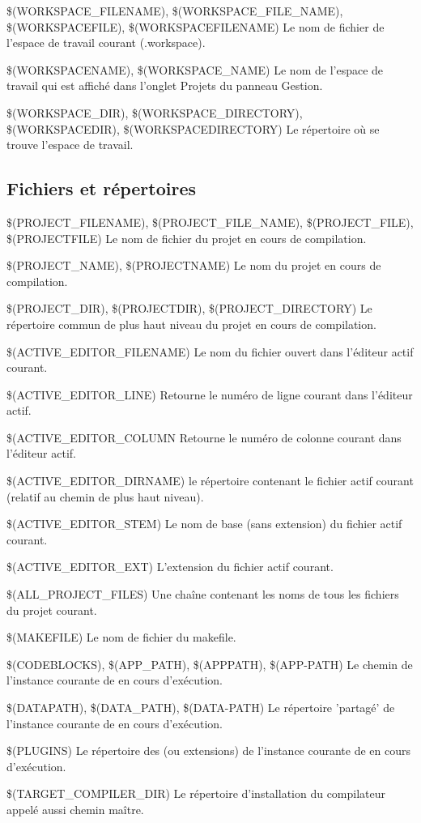 \begin{codeentry}
\item[\$(WORKSPACE\_FILENAME), \$(WORKSPACE\_FILE\_NAME), \$(WORKSPACEFILE), \$(WORKSPACEFILENAME)] Le nom de fichier de l'espace de travail courant (.workspace).
\item[\$(WORKSPACENAME), \$(WORKSPACE\_NAME)] Le nom de l'espace de travail qui est affiché dans l'onglet Projets du panneau Gestion.
\item[\$(WORKSPACE\_DIR), \$(WORKSPACE\_DIRECTORY), \$(WORKSPACEDIR), \$(WORKSPACEDIRECTORY)] Le répertoire où se trouve l'espace de travail.
\end{codeentry}

\subsection{Fichiers et répertoires}

\begin{codeentry}
\item[\$(PROJECT\_FILENAME), \$(PROJECT\_FILE\_NAME), \$(PROJECT\_FILE), \$(PROJECTFILE)] Le nom de fichier du projet en cours de compilation.
\item[\$(PROJECT\_NAME), \$(PROJECTNAME)] Le nom du projet en cours de compilation.
\item[\$(PROJECT\_DIR), \$(PROJECTDIR), \$(PROJECT\_DIRECTORY)] Le répertoire commun de plus haut niveau du projet en cours de compilation.
\item[\$(ACTIVE\_EDITOR\_FILENAME)] Le nom du fichier ouvert dans l'éditeur actif courant.
\item[\$(ACTIVE\_EDITOR\_LINE)] Retourne le numéro de ligne courant dans l'éditeur actif.
\item[\$(ACTIVE\_EDITOR\_COLUMN] Retourne le numéro de colonne courant dans l'éditeur actif.
\item[\$(ACTIVE\_EDITOR\_DIRNAME)] le répertoire contenant le fichier actif courant (relatif au chemin de plus haut niveau).
\item[\$(ACTIVE\_EDITOR\_STEM)] Le nom de base (sans extension) du fichier actif courant.
\item[\$(ACTIVE\_EDITOR\_EXT)] L'extension du fichier actif courant.
\item[\$(ALL\_PROJECT\_FILES)] Une chaîne contenant les noms de tous les fichiers du projet courant.
\item[\$(MAKEFILE)] Le nom de fichier du makefile.
\item[\$(CODEBLOCKS), \$(APP\_PATH), \$(APPPATH), \$(APP-PATH)] Le chemin de l'instance courante de \codeblocks en cours d'exécution.
\item[\$(DATAPATH), \$(DATA\_PATH), \$(DATA-PATH)] Le répertoire 'partagé' de l'instance courante de \codeblocks en cours d'exécution.
\item[\$(PLUGINS)] Le répertoire des  (ou extensions) de l'instance courante de \codeblocks en cours d'exécution.
\item[\$(TARGET\_COMPILER\_DIR)] Le répertoire d'installation du compilateur appelé aussi chemin maître.
\end{codeentry}

